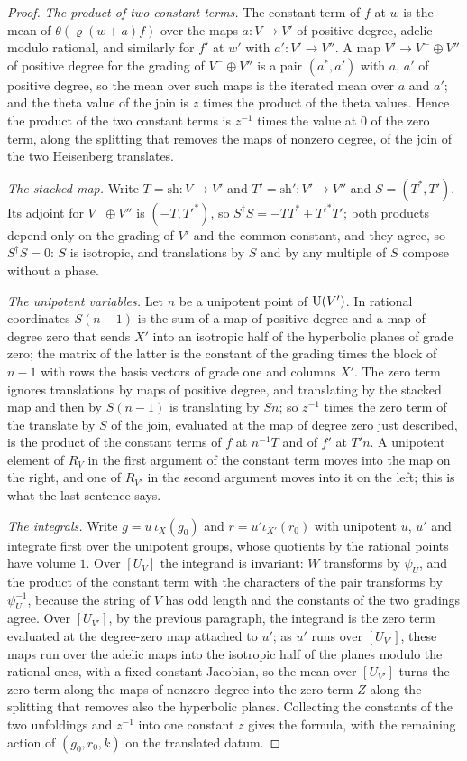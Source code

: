 \begin{proof}
\emph{The product of two constant terms.} The constant term of $f$ at $w$ is the mean of $\theta(\varrho(w+a)f)$ over the maps $a\colon V\to V'$ of positive degree, adelic modulo rational, and similarly for $f'$ at $w'$ with $a'\colon V'\to V''$. A map $V'\to V^-\oplus V''$ of positive degree for the grading of $V^-\oplus V''$ is a pair
$(a^*,a')$ with $a$, $a'$ of positive degree, so the mean over such maps is the iterated mean over $a$ and $a'$; and the theta value of the join is $z$ times the product of the theta values. Hence the product of the two constant terms is $z^{-1}$ times the value at $0$ of the zero term, along the splitting that removes the maps of nonzero degree, of
the join of the two Heisenberg translates.

\emph{The stacked map.} Write $T=\mathrm{sh}\colon V\to V'$ and $T'=\mathrm{sh}'\colon V'\to V''$ and $S=(T^*,T')$. Its adjoint for $V^-\oplus V''$ is $(-T,T'^*)$, so $S^\dagger S=-TT^*+T'^*T'$; both products depend only on the grading of $V'$ and the common constant, and they agree, so $S^\dagger S=0$: $S$ is isotropic, and translations by $S$ and by
any multiple of $S$ compose without a phase.

\emph{The unipotent variables.} Let $n$ be a unipotent point of $\operatorname{U}(V')$. In rational coordinates $S(n-1)$ is the sum of a map of positive degree and a map of degree zero that sends $X'$ into an isotropic half of the hyperbolic planes of grade zero; the matrix of the latter is the constant of the grading times the block of $n-1$ with rows the basis
vectors of grade one and columns $X'$. The zero term ignores translations by maps of positive degree, and translating by the stacked map and then by $S(n-1)$ is translating by $Sn$; so $z^{-1}$ times the zero term of the translate by $S$ of the join, evaluated at the map of degree zero just described, is the product of the constant terms of $f$ at
$n^{-1}T$ and of $f'$ at $T'n$. A unipotent element of $R_V$ in the first argument of the constant term moves into the map on the right, and one of $R_{V'}$ in the second argument moves into it on the left; this is what the last sentence says.

\emph{The integrals.} Write $g=u\,\iota_X(g_0)$ and $r=u'\iota_{X'}(r_0)$ with unipotent $u$, $u'$ and integrate first over the unipotent groups, whose quotients by the rational points have volume $1$. Over $[U_V]$ the integrand is invariant: $W$ transforms by $\psi_U$, and the product of the constant term with the characters of the pair transforms by
$\psi_U^{-1}$, because the string of $V$ has odd length and the constants of the two gradings agree. Over $[U_{V'}]$, by the previous paragraph, the integrand is the zero term evaluated at the degree-zero map attached to $u'$; as $u'$ runs over $[U_{V'}]$, these maps run over the adelic maps into the isotropic half of the planes modulo the rational ones,
with a fixed constant Jacobian, so the mean over $[U_{V'}]$ turns the zero term along the maps of nonzero degree into the zero term $Z$ along the splitting that removes also the hyperbolic planes. Collecting the constants of the two unfoldings and $z^{-1}$ into one constant $z$ gives the formula, with the remaining action of $(g_0,r_0,k)$ on
the translated datum.


\end{proof}
